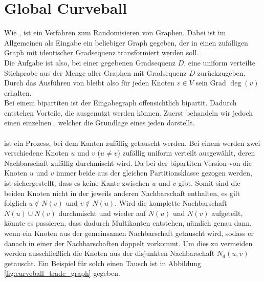 \section{Global Curveball }
\label{sec:global_curveball}
Wie , ist \gc{} ein Verfahren zum Randomisieren von Graphen.
Dabei ist im Allgemeinen als Eingabe ein beliebiger Graph gegeben, der in einen zufälligen
Graph mit identischer Gradsequenz transformiert werden soll. 
\\
Die Aufgabe ist also, bei einer gegebenen Gradsequenz $D$, eine uniform verteilte Stichprobe
aus der Menge aller Graphen mit Gradsequenz $D$ zurückzugeben. Durch das Ausführen von \gc{} 
bleibt also für jeden Knoten $v\in V$ sein Grad $\deg(v)$ erhalten. 
\\
Bei einem bipartiten \gc{} ist der Eingabegraph offensichtlich bipartit. Dadurch entstehen 
Vorteile, die ausgenutzt werden können. Zuerst behandeln wir jedoch einen einzelnen \cb{}, welcher
die Grundlage eines jeden \gc{} darstellt.
\\
\\
\fett{\cb{}} ist  ein Prozess, bei dem Kanten zufällig getauscht werden. Bei einem \ct{} werden
zwei verschiedene Knoten $u$ und $v$ ($u\neq v$) zufällig uniform verteilt ausgewählt, deren Nachbarschaft
zufällig durchmischt wird. Da bei der bipartiten Version  von \cb{}
die Knoten $u$ und $v$ immer beide aus der gleichen Partitionsklasse gezogen werden, ist sichergestellt, dass
es keine Kante zwischen $u$ und $v$ gibt. Somit sind die beiden Knoten nicht in der jeweils anderen Nachbarschaft
enthalten, es gilt folglich $u\notin N(v)$ und $v\notin N(u)$.
Wird die komplette Nachbarschaft $N(u) \cup N(v)$ durchmischt und wieder auf $ N(u)$ und $N(v)$ 
aufgeteilt, könnte es passieren, 
dass dadurch Multikanten entstehen,  
nämlich genau dann, wenn ein Knoten aus der gemeinsamen Nachbarschaft getauscht wird, sodass er danach in 
einer der Nachbarschaften doppelt vorkommt.
Um dies zu vermeiden werden ausschließlich die Knoten aus der disjunkten Nachbarschaft $N_{d}(u,v)$ getauscht.
Ein Beispiel für solch einen Tausch ist in Abbildung \ref{fig:curveball_trade_graph} gegeben.
%
%
%
